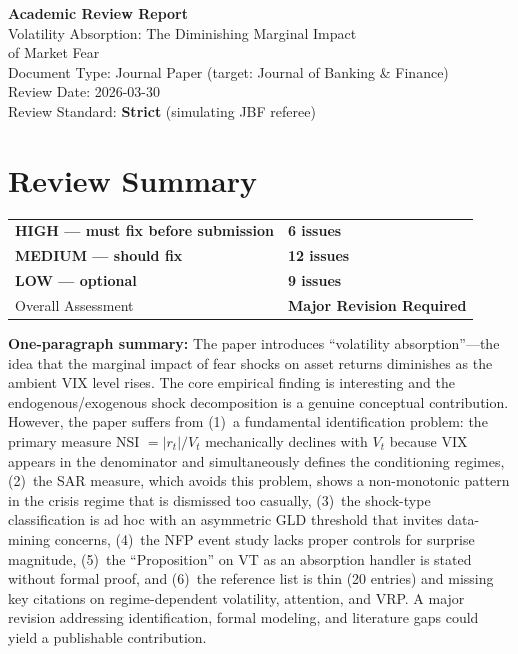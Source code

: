 \documentclass[12pt,a4paper]{article}
\begin{document}
\begin{center}
{\Large\bfseries Academic Review Report}\\[0.5em]
{\large Volatility Absorption: The Diminishing Marginal Impact\\
of Market Fear}\\[0.5em]
{\normalsize Document Type: Journal Paper (target: Journal of Banking \& Finance)}\\
{\normalsize Review Date: 2026-03-30}\\
{\normalsize Review Standard: \textbf{Strict} (simulating JBF referee)}
\end{center}

\vspace{1em}

\section*{Review Summary}

\begin{tabular}{ll}
\textcolor{errorred}{\textbf{HIGH --- must fix before submission}} & \textbf{6 issues} \\
\textcolor{warncolor}{\textbf{MEDIUM --- should fix}} & \textbf{12 issues} \\
\textcolor{okgreen}{\textbf{LOW --- optional}} & \textbf{9 issues} \\[0.5em]
Overall Assessment & \textbf{Major Revision Required} \\
\end{tabular}

\vspace{0.5em}
\noindent\textbf{One-paragraph summary:}
The paper introduces ``volatility absorption''---the idea that the marginal impact of fear shocks on asset returns diminishes as the ambient VIX level rises. The core empirical finding is interesting and the endogenous/exogenous shock decomposition is a genuine conceptual contribution. However, the paper suffers from (1)~a fundamental identification problem: the primary measure NSI $= |r_t|/V_t$ mechanically declines with $V_t$ because VIX appears in the denominator and simultaneously defines the conditioning regimes, (2)~the SAR measure, which avoids this problem, shows a non-monotonic pattern in the crisis regime that is dismissed too casually, (3)~the shock-type classification is ad hoc with an asymmetric GLD threshold that invites data-mining concerns, (4)~the NFP event study lacks proper controls for surprise magnitude, (5)~the ``Proposition'' on VT as an absorption handler is stated without formal proof, and (6)~the reference list is thin (20 entries) and missing key citations on regime-dependent volatility, attention, and VRP. A major revision addressing identification, formal modeling, and literature gaps could yield a publishable contribution.
\end{document}
